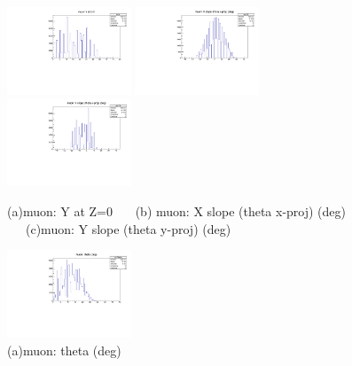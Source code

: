 \documentclass[a4paper,11pt]{article}
\theoremstyle{mytheor}
\begin{document}
\begin{figure}[H] 
\vspace*{-0.3cm} 
\includegraphics[width=0.33\textwidth,scale=0.5,trim=0 0 0 0,clip]{plotsdir/file0_test-muY-1.pdf} 
\includegraphics[width=0.33\textwidth,scale=0.5,trim=0 0 0 0,clip]{plotsdir/file0_test-muXS-1.pdf} 
\includegraphics[width=0.33\textwidth,scale=0.5,trim=0 0 0 0,clip]{plotsdir/file0_test-muYS-1.pdf} 
\caption{(a)muon: Y at Z=0 ~~~(b) muon: X slope (theta x-proj) (deg) ~~~(c)muon: Y slope (theta y-proj) (deg) } 
\end{figure} 
\begin{figure}[H] 
\vspace*{-0.3cm} 
\includegraphics[width=0.33\textwidth,scale=0.5,trim=0 0 0 0,clip]{plotsdir/file0_test-muTheta-1.pdf} 
\caption{(a)muon: theta (deg) } 
\end{figure} 
\newpage 
\end{document}
